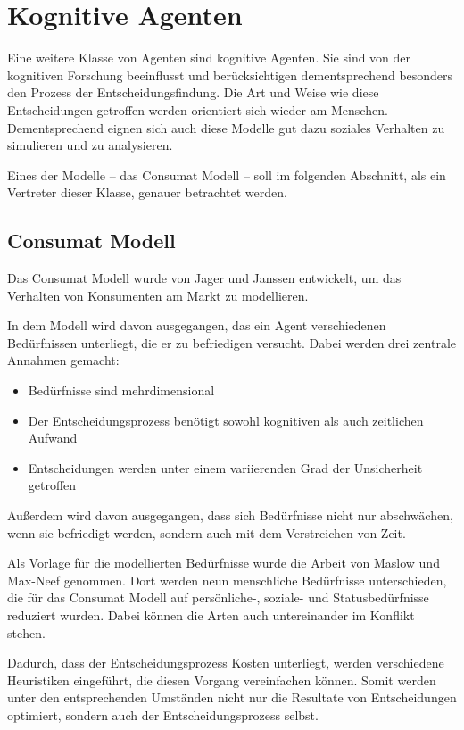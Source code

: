 \chapter{Kognitive Agenten}
Eine weitere Klasse von Agenten sind kognitive Agenten.
Sie sind von der kognitiven Forschung beeinflusst und berücksichtigen dementsprechend besonders den Prozess der Entscheidungsfindung.
Die Art und Weise wie diese Entscheidungen getroffen werden orientiert sich wieder am Menschen.
Dementsprechend eignen sich auch diese Modelle gut dazu soziales Verhalten zu simulieren und zu analysieren.

Eines der Modelle -- das Consumat Modell -- soll im folgenden Abschnitt, als ein Vertreter dieser Klasse, genauer betrachtet werden.

\section{Consumat Modell}
Das Consumat Modell wurde von Jager und Janssen entwickelt, um das Verhalten von Konsumenten am Markt zu modellieren\cite{?}.%

In dem Modell wird davon ausgegangen, das ein Agent verschiedenen Bedürfnissen unterliegt, die er zu befriedigen versucht.
Dabei werden drei zentrale Annahmen gemacht:
\begin{itemize}
    \item Bedürfnisse sind mehrdimensional
    \item Der Entscheidungsprozess benötigt sowohl kognitiven als auch zeitlichen Aufwand
    \item Entscheidungen werden unter einem variierenden Grad der Unsicherheit getroffen
\end{itemize}
Außerdem wird davon ausgegangen, dass sich Bedürfnisse nicht nur abschwächen, wenn sie befriedigt werden, sondern auch mit dem Verstreichen von Zeit.

Als Vorlage für die modellierten Bedürfnisse wurde die Arbeit von Maslow\cite{?} und Max-Neef genommen.
Dort werden neun menschliche Bedürfnisse unterschieden, die für das Consumat Modell auf persönliche-, soziale- und Statusbedürfnisse reduziert wurden.
Dabei können die Arten auch untereinander im Konflikt stehen.

Dadurch, dass der Entscheidungsprozess Kosten unterliegt, werden verschiedene Heuristiken eingeführt, die diesen Vorgang vereinfachen können.
Somit werden unter den entsprechenden Umständen nicht nur die Resultate von Entscheidungen optimiert, sondern auch der Entscheidungsprozess selbst.

